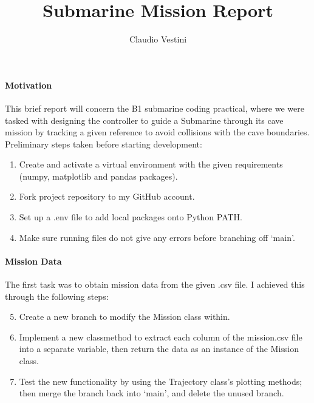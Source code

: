 \documentclass[hidelinks]{article}
\title{\vspace{-4cm} Submarine Mission Report}
\author{\vspace{-2cm} Claudio Vestini}
\date{}
\begin{document}
\maketitle
%
\paragraph{Motivation}
This brief report will concern the B1 submarine coding practical, where
we were tasked with designing the controller to guide a Submarine through its cave mission by tracking a given reference to avoid collisions with the cave boundaries.
Preliminary steps taken before starting development:
%
\begin{enumerate}
    \item Create and activate a virtual environment with the given requirements (numpy, matplotlib and pandas packages).
    \item Fork project repository to my GitHub account.
    \item Set up a .env file to add local packages onto Python PATH.
    \item Make sure running files do not give any errors before branching off `main'.
\end{enumerate}
%
\paragraph{Mission Data}
The first task was to obtain mission data from the given .csv file. I achieved this through the following steps:
%
\begin{enumerate}
    \setcounter{enumi}{4}
    \item Create a new branch to modify the Mission class within.
    \item Implement a new classmethod to extract each column of the mission.csv file into a separate variable, then return the data as an instance of the Mission class.
    \item Test the new functionality by using the Trajectory class's plotting methods; then merge the branch back into `main', and delete the unused branch.
\end{enumerate}
%
\end{document}
